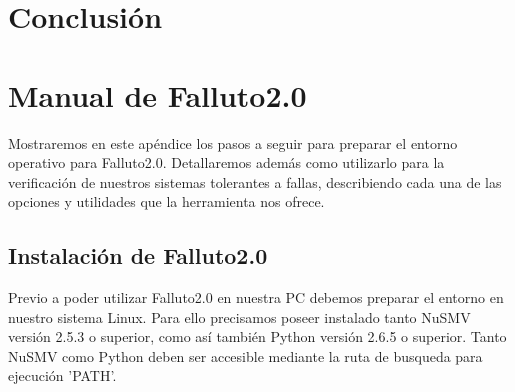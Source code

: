 \documentclass[titlepage, 12pt]{book}
\begin{document}



\chapter{Conclusi\'on}



\appendix
\appendixpage
\noappendicestocpagenum
\addappheadtotoc

\chapter{Manual de Falluto2.0}
Mostraremos en este ap\'endice los pasos a seguir para preparar el entorno operativo para Falluto2.0. Detallaremos adem\'as como utilizarlo para la verificaci\'on de nuestros sistemas tolerantes a fallas, describiendo cada una de las opciones y utilidades que la herramienta nos ofrece.

\section{Instalaci\'on de Falluto2.0}
Previo a poder utilizar Falluto2.0 en nuestra PC debemos preparar el entorno en nuestro sistema Linux. Para ello precisamos poseer instalado tanto NuSMV versi\'on 2.5.3 o superior, como as\'i tambi\'en Python versi\'on 2.6.5 o superior. Tanto NuSMV como Python deben ser accesible mediante la ruta de busqueda para ejecuci\'on 'PATH'.
\end{document}
